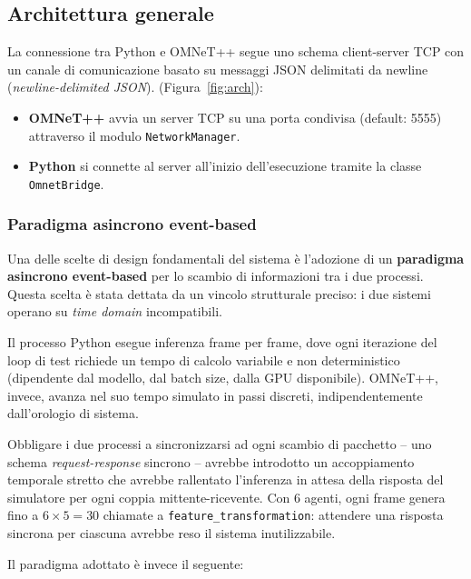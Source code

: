 \documentclass[12pt,a4paper]{article}
\begin{document}
\subsection{Architettura generale}

La connessione tra Python e OMNeT++ segue uno schema client-server TCP con un canale di
comunicazione basato su messaggi JSON delimitati da newline (\textit{newline-delimited JSON}).
(Figura~\ref{fig:arch}):

\begin{itemize}
  \item \textbf{OMNeT++} avvia un server TCP su una porta condivisa (default: 5555) attraverso
        il modulo \texttt{NetworkManager}.
  \item \textbf{Python} si connette al server all'inizio dell'esecuzione tramite la classe
        \texttt{OmnetBridge}.
\end{itemize}

\subsubsection{Paradigma asincrono event-based}

Una delle scelte di design fondamentali del sistema \`e l'adozione di un \textbf{paradigma
asincrono event-based} per lo scambio di informazioni tra i due processi. Questa scelta
\`e stata dettata da un vincolo strutturale preciso: i due sistemi operano su \textit{time
domain} incompatibili.

Il processo Python esegue inferenza frame per frame, dove ogni iterazione del loop di test
richiede un tempo di calcolo variabile e non deterministico (dipendente dal modello, dal
batch size, dalla GPU disponibile). OMNeT++, invece, avanza nel suo tempo simulato in passi
discreti, indipendentemente dall'orologio di sistema.

Obbligare i due processi a sincronizzarsi ad ogni scambio di pacchetto -- uno schema
\textit{request-response} sincrono -- avrebbe introdotto un accoppiamento temporale stretto
che avrebbe rallentato l'inferenza in attesa della risposta del simulatore per ogni coppia
mittente-ricevente. Con 6 agenti, ogni frame genera fino a $6 \times 5 = 30$ chiamate a
\texttt{feature\_transformation}: attendere una risposta sincrona per ciascuna avrebbe reso
il sistema inutilizzabile.

Il paradigma adottato \`e invece il seguente:
\end{document}
